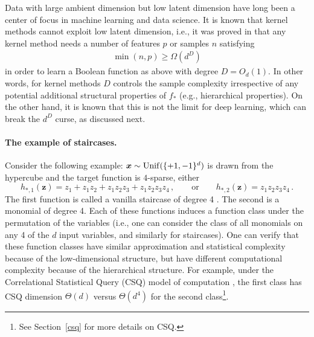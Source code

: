 \documentclass[11pt]{article}
\newcommand{\<}{\langle}
\renewcommand{\>}{\rangle}
\theoremstyle{definition}
\def\bx{{\boldsymbol x}}
\def\bz{{\boldsymbol z}}
\def\Unif{{\rm Unif}}
\def\Unif{{\sf Unif}}
\def\Unif{{\sf Unif}}
\def\bz{{\boldsymbol z}}
\def\bx{{\boldsymbol x}}
\def\Unif{{\rm Unif}}
\def\bz{{\boldsymbol z}}
\begin{document}
Data with large ambient dimension but low latent dimension have long been a center of focus in machine learning and data science. It is known that kernel methods cannot exploit low latent dimension, i.e., it was proved in \cite{hsu2021approximation,hsudimension,kamath_dim,abbe2022merged} that any kernel method needs a number of features $p$ or samples $n$ satisfying 
\begin{align}
\min(n,p) \ge \Omega(d^D)
\end{align}
in order to learn a Boolean function as above with degree $D=O_d(1)$. 
In other words, for kernel methods $D$ controls the sample complexity irrespective of any potential additional structural properties of $f_*$ (e.g., hierarchical properties). On the other hand, it is known that this is not the limit for deep learning, which can break the $d^D$ curse, as discussed next. 

\paragraph{The example of staircases.} Consider the following example: $\bx \sim \Unif (\{+1 , - 1\}^d)$ is drawn from the hypercube and the target function is $4$-sparse, either
 \[
 h_{*,1} (\bz)= z_1 + z_1z_2 + z_1z_2z_3 + z_1z_2z_3z_4 \, , \qquad \mbox{or} \qquad  h_{*,2} (\bz) = z_1 z_2 z_3 z_4 \, .
 \]
The first function is called a vanilla staircase of degree 4 \citep{abbe2021staircase,abbe2022merged}. The second is a monomial of degree 4.
Each of these functions induces a function class under the permutation of the variables (i.e., one can consider the class of all monomials on any 4 of the $d$ input variables, and similarly for staircases).
One can verify that these function classes have similar approximation and statistical complexity because of the low-dimensional structure, but have different computational complexity because of the hierarchical structure. For example, under the Correlational Statistical Query (CSQ) model of computation \citep{bendavid1995learning,kearns1998efficient,bshouty2002using}, the first class has CSQ dimension $\Theta(d)$ versus $\Theta(d^4)$ for the second class\footnote{See Section~\ref{csq} for more details on CSQ.}.
\end{document}
